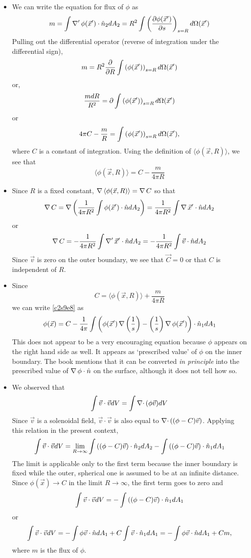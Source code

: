 \begin{itemize}
\item We can write the equation for flux of $\phi$ as
\[
m = \int\operatorname{\nabla}^\prime{\phi}(\vec{x}^\prime)\cdot\hat{n}_2 dA_2 = R^2\int \left(\frac{\partial{\phi(\vec{x}^\prime)}}{\partial{s}}\right)_{s=R} d\Omega(\vec{x}^\prime)
\]
Pulling out the differential operator (reverse of integration under the differential sign),
\[
m = R^2\frac{\partial}{\partial R}\int \left(\phi(\vec{x}^\prime)\right)_{s=R} d\Omega(\vec{x}^\prime)
\]
or,
\[
\frac{m dR}{R^2} = \partial\int \left(\phi(\vec{x}^\prime)\right)_{s=R} d\Omega(\vec{x}^\prime)
\]
or
\[
4\pi C - \frac{m}{R} = \int \left(\phi(\vec{x}^\prime)\right)_{s=R} d\Omega(\vec{x}^\prime),
\]
where $C$ is a constant of integration. Using the definition of $\langle\phi(\vec{x}, R)\rangle$, we see that
\[
\langle\phi(\vec{x}, R)\rangle = C - \frac{m}{4\pi R}
\]

\item Since $R$ is a fixed constant, $\operatorname{\nabla}{\langle\phi(\vec{x}, R)\rangle} = \operatorname{\nabla}{C}$ so that
\[
\operatorname{\nabla}{C} = \operatorname{\nabla}{\left(\frac{1}{4\pi R^2}\int\phi(\vec{x}^\prime)\cdot\hat{n} dA_2\right)} = \frac{1}{4\pi R^2}\int\operatorname{\nabla}{\vec{x}^\prime}\cdot\hat{n} dA_2
\]
or
\[
\operatorname{\nabla}{C} = -\frac{1}{4\pi R^2}\int\operatorname{\nabla}^\prime{\vec{x}^\prime}\cdot\hat{n} dA_2 = -\frac{1}{4\pi R^2}\int\vec{v}\cdot\hat{n} dA_2
\]
Since $\vec{v}$ is zero on the outer boundary, we see that $\vec{C} = 0$ or that $C$ is independent of $R$.

\item Since
\[
C = \langle\phi(\vec{x}, R)\rangle + \frac{m}{4\pi R}
\]
we can write \eqref{c2s9e8} as
\[
\phi(\vec{x}) = C - \frac{1}{4\pi}\int\left(\phi(\vec{x}^\prime)\operatorname{\nabla}{\left(\frac{1}{s}\right)} - \left(\frac{1}{s}\right)\operatorname{\nabla}{\phi(\vec{x}^\prime)}\right)\cdot\hat{n}_1dA_1
\]
This does not appear to be a very encouraging equation because $\phi$ appears on the right hand side as well. It appears as \enquote*{prescribed value} of $\phi$ on the inner boundary.
The book mentions that it can be converted \emph{in principle} into the prescribed value of $\operatorname{\nabla}{\phi}\cdot\hat{n}$ on the surface, although it does not tell how so.

\item We observed that 
\[
\int\vec{v}\cdot\vec{v}dV = \int\operatorname{\nabla\cdot}{(\phi\vec{v})}dV
\]
Since $\vec{v}$ is a solenoidal field, $\vec{v}\cdot\vec{v}$ is also equal to $\operatorname{\nabla\cdot}{\left((\phi - C)\vec{v}\right)}$.
Applying this relation in the present context,
\[
\int\vec{v}\cdot\vec{v}dV = \lim_{R \rightarrow \infty}\int\left((\phi - C)\vec{v}\right)\cdot\hat{n}_2 dA_2 - \int\left((\phi - C)\vec{v}\right)\cdot\hat{n}_1 dA_1
\]
The limit is applicable only to the first term because the inner boundary is fixed while the outer, spherical one is assumed to be at an infinite distance. Since $\phi(\vec{x}) 
\rightarrow C$ in the limit $R \rightarrow \infty$, the first term goes to zero and
\[
\int\vec{v}\cdot\vec{v}dV = - \int\left((\phi - C)\vec{v}\right)\cdot\hat{n}_1 dA_1
\]
or
\[
\int\vec{v}\cdot\vec{v}dV = -\int\phi\vec{v}\cdot\hat{n} dA_1 + C\int\vec{v}\cdot\hat{n}_1 dA_1 = -\int\phi\vec{v}\cdot\hat{n} dA_1 + Cm,
\]
where $m$ is the flux of $\phi$.


\end{itemize}

